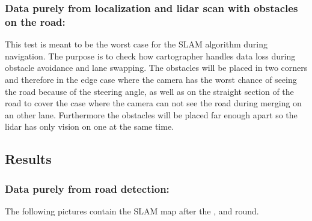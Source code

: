 \subsubsection{Data purely from localization and lidar scan with obstacles on the road:}
This test is meant to be the worst case for the SLAM algorithm during navigation. The purpose is to check how cartographer handles data loss during obstacle avoidance and lane swapping.
The obstacles will be placed in two corners and therefore in the edge case where the camera has the worst chance of seeing the road because of the steering angle, as well as on the straight section of the road to cover the case where the camera can not see the road during merging on an other lane. Furthermore the obstacles will be placed far enough apart so the lidar has only vision on one at the same time.\\

\subsection{Results}
\subsubsection{Data purely from road detection:}

The following pictures contain the SLAM map after the , and  round.\\

